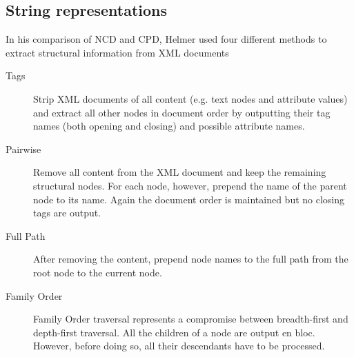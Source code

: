 \subsection{String representations}
In his comparison of NCD and CPD, Helmer\cite{} used four different methods to extract structural information from XML documents
\begin{description}
\item[Tags] Strip XML documents of all content (e.g. text nodes and attribute values) and extract all other nodes in document order by outputting their tag names (both opening and closing) and possible attribute names.
\item[Pairwise] Remove all content from the XML document and keep the remaining structural nodes. For each node, however, prepend the name of the parent node to its name. Again the document order is maintained but no closing tags are output.
\item[Full Path] After removing the content, prepend node names to the full path from the root node to the current node.
\item[Family Order] Family Order traversal represents a compromise between breadth-first and depth-first traversal. All the children of a node are output en bloc. However, before doing so, all their descendants have to be processed. 
\end{description}

